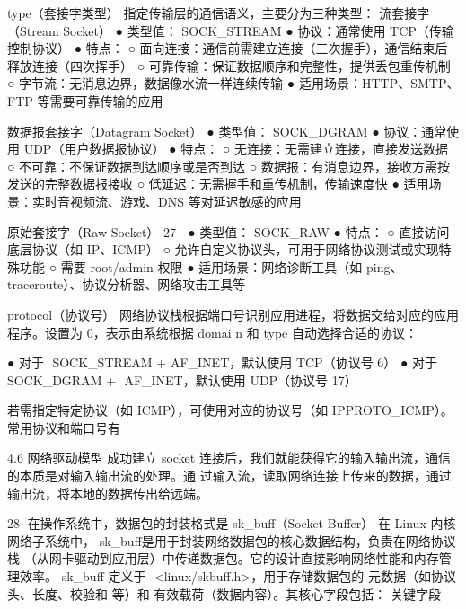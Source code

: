 type（套接字类型）
指定传输层的通信语义，主要分为三种类型：
流套接字（Stream Socket）
  ● 类型值： SOCK_STREAM﻿
  ● 协议：通常使用 TCP（传输控制协议）
  ● 特点：
     ○ 面向连接：通信前需建立连接（三次握手），通信结束后释放连接（四次挥手）
     ○ 可靠传输：保证数据顺序和完整性，提供丢包重传机制
     ○ 字节流：无消息边界，数据像水流一样连续传输
  ● 适用场景：HTTP、SMTP、FTP 等需要可靠传输的应用

数据报套接字（Datagram Socket）
  ● 类型值： SOCK_DGRAM﻿
  ● 协议：通常使用 UDP（用户数据报协议）
  ● 特点：
     ○ 无连接：无需建立连接，直接发送数据
     ○ 不可靠：不保证数据到达顺序或是否到达
     ○ 数据报：有消息边界，接收方需按发送的完整数据报接收
     ○ 低延迟：无需握手和重传机制，传输速度快
  ● 适用场景：实时音视频流、游戏、DNS 等对延迟敏感的应用

原始套接字（Raw Socket）
                                                       27
 ●  类型值： SOCK_RAW﻿
  ● 特点：
      ○ 直接访问底层协议（如 IP、ICMP）
      ○ 允许自定义协议头，可用于网络协议测试或实现特殊功能
      ○ 需要 root/admin 权限
  ● 适用场景：网络诊断工具（如 ping、traceroute）、协议分析器、网络攻击工具等

protocol（协议号）
网络协议栈根据端口号识别应用进程，将数据交给对应的应用程序。设置为 0，表示由系统根据 ﻿domai
n﻿ 和 type﻿ 自动选择合适的协议：

  ● 对于 ﻿ SOCK_STREAM﻿ + ﻿AF_INET﻿，默认使用 TCP（协议号 6）
  ● 对于 ﻿ SOCK_DGRAM﻿ + ﻿
                       AF_INET﻿，默认使用 UDP（协议号 17）

若需指定特定协议（如 ICMP），可使用对应的协议号（如 ﻿IPPROTO_ICMP﻿）。常用协议和端口号有




4.6 网络驱动模型
成功建立 socket 连接后，我们就能获得它的输入输出流，通信的本质是对输入输出流的处理。通
过输入流，读取网络连接上传来的数据，通过输出流，将本地的数据传出给远端。




                                                    28
在操作系统中，数据包的封装格式是 sk_buff﻿（Socket Buffer）
在 Linux 内核网络子系统中， ﻿sk_buff﻿是用于封装网络数据包的核心数据结构，负责在网络协议栈
（从网卡驱动到应用层）中传递数据包。它的设计直接影响网络性能和内存管理效率。
 sk_buff﻿ 定义于 ﻿
              <linux/skbuff.h>﻿，用于存储数据包的 元数据（如协议头、长度、校验和
等）和 有效载荷（数据内容）。其核心字段包括：
关键字段




